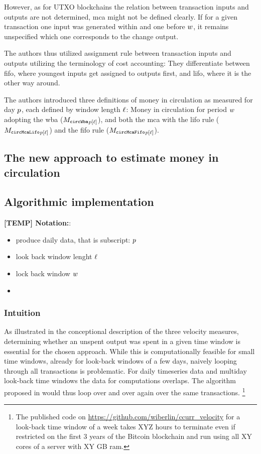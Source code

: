 However, as for UTXO blockchains the relation between transaction inputs and outputs are not determined, \ac{mca} might not be defined clearly. %
If for a given transaction one input was generated within and one before ${w}$, it remains unspecified which one corresponds to the change output.  %

The authors thus utilized assignment rule between transaction inputs and outputs utilizing the terminology of cost accounting: %
They differentiate between \ac{fifo}, where youngest inputs get assigned to outputs first, and \ac{lifo}, where it is the other way around.  %

The authors introduced three definitions of money in circulation as measured for day \({p}\), each defined by window length ${\ell}$: %
Money in circulation for period ${w}$ adopting the \ac{wba} ($ {{M_{\mathtt{circWba}}}_{{p}[{\ell}]}} $), and both the \ac{mca} with the \ac{lifo} rule ($ {{M_{\mathtt{circMcaLifo}}}_{{p}[{\ell}]}} $) and the \ac{fifo} rule ($ {{M_{\mathtt{circMcaFifo}}}_{{p}[{\ell}]}} $).


\subsection{The new approach to estimate money in circulation}
\label{sec:orig_approach}%


\subsection{Algorithmic implementation}
\label{sec:cc_money_seg:sub:mcirc_pract}%

\textbf{[TEMP] Notation:}:
\begin{itemize}
\item produce daily data, that is subscript: \({p}\)
\item look back window lenght \({\ell}\)
\item lock back window \({w}\)
\item 
\end{itemize}

\subsubsection{Intuition}
As illustrated in the conceptional description of the three velocity measures,
determining whether an unspent output was spent in a given time window is essential for
the chosen approach. %
While this is computationally feasible for small time windows, already for look-back windows
of a few days, naively looping through all transactions is problematic. %
For daily timeseries data and multiday look-back time windows the data for computations overlaps. %
The algorithm proposed in \cite{pernice2019cryptocurrencies} would thus loop over
and over again over the same transactions. %
\footnote{The published code on \url{https://github.com/wiberlin/ccurr_velocity} for a look-back time window of a week takes XYZ hours to terminate even if restricted on the first 3 years of the Bitcoin blockchain and run using all XY cores of a server with XY GB ram.}  

